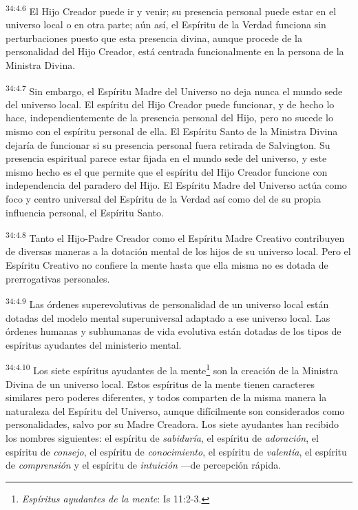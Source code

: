 \par
\textsuperscript{34:4.6} El Hijo Creador puede ir y venir; su presencia personal puede estar en el universo local o en otra parte; aún así, el Espíritu de la Verdad funciona sin perturbaciones puesto que esta presencia divina, aunque procede de la personalidad del Hijo Creador, está centrada funcionalmente en la persona de la Ministra Divina.

\par
\textsuperscript{34:4.7} Sin embargo, el Espíritu Madre del Universo no deja nunca el mundo sede del universo local. El espíritu del Hijo Creador puede funcionar, y de hecho lo hace, independientemente de la presencia personal del Hijo, pero no sucede lo mismo con el espíritu personal de ella. El Espíritu Santo de la Ministra Divina dejaría de funcionar si su presencia personal fuera retirada de Salvington. Su presencia espiritual parece estar fijada en el mundo sede del universo, y este mismo hecho es el que permite que el espíritu del Hijo Creador funcione con independencia del paradero del Hijo. El Espíritu Madre del Universo actúa como foco y centro universal del Espíritu de la Verdad así como del de su propia influencia personal, el Espíritu Santo.

\par
\textsuperscript{34:4.8} Tanto el Hijo-Padre Creador como el Espíritu Madre Creativo contribuyen de diversas maneras a la dotación mental de los hijos de su universo local. Pero el Espíritu Creativo no confiere la mente hasta que ella misma no es dotada de prerrogativas personales.

\par
\textsuperscript{34:4.9} Las órdenes superevolutivas de personalidad de un universo local están dotadas del modelo mental superuniversal adaptado a ese universo local. Las órdenes humanas y subhumanas de vida evolutiva están dotadas de los tipos de espíritus ayudantes del ministerio mental.

\par
\textsuperscript{34:4.10} Los siete espíritus ayudantes de la mente\footnote{\textit{Espíritus ayudantes de la mente}: Is 11:2-3.} son la creación de la Ministra Divina de un universo local. Estos espíritus de la mente tienen caracteres similares pero poderes diferentes, y todos comparten de la misma manera la naturaleza del Espíritu del Universo, aunque difícilmente son considerados como personalidades, salvo por su Madre Creadora. Los siete ayudantes han recibido los nombres siguientes: el espíritu de \textit{sabiduría}, el espíritu de \textit{adoración}, el espíritu de \textit{consejo}, el espíritu de \textit{conocimiento}, el espíritu de \textit{valentía}, el espíritu de \textit{comprensión} y el espíritu de \textit{intuición} ---de percepción rápida.

